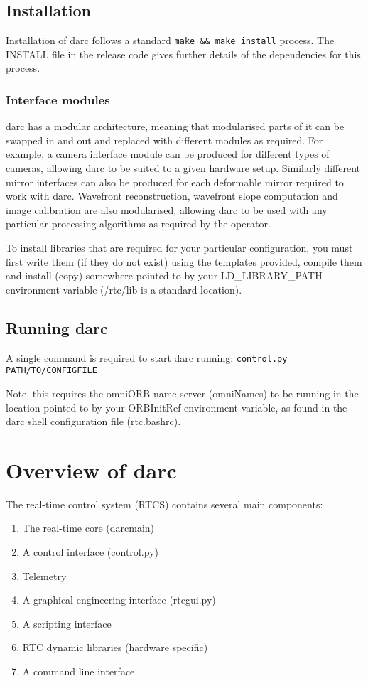 \documentclass[a4,10pt]{article}
\newcommand{\rtcs}{real-time control system (RTCS)\renewcommand{\rtcs}{RTCS\xspace}\xspace}
\begin{document}
\subsection{Installation}
Installation of darc follows a standard {\tt make \&\& make install}
process.  The INSTALL file in the release code gives further details
of the dependencies for this process.

\subsubsection{Interface modules}
darc has a modular architecture, meaning that modularised parts of it
can be swapped in and out and replaced with different modules as
required.  For example, a camera interface module can be produced for
different types of cameras, allowing darc to be suited to a given
hardware setup.  Similarly different mirror interfaces can also be
produced for each deformable mirror required to work with darc.
Wavefront reconstruction, wavefront slope computation and image
calibration are also modularised, allowing darc to be used with any
particular processing algorithms as required by the operator.

To install libraries that are required for your particular
configuration, you must first write them (if they do not exist) using
the templates provided, compile them and install (copy) somewhere pointed to
by your LD\_LIBRARY\_PATH environment variable (/rtc/lib is a standard
location).

\subsection{Running darc}
A single command is required to start darc running: 
{\tt control.py PATH/TO/CONFIGFILE}

Note, this requires the omniORB name server (omniNames) to be running in the
location pointed to by your ORBInitRef environment variable, as found
in the darc shell configuration file (rtc.bashrc).

\section{Overview of darc}
The \rtcs contains several main components:
\begin{enumerate}
\item The real-time core (darcmain)
\item A control interface (control.py)
\item Telemetry
\item A graphical engineering interface (rtcgui.py)
\item A scripting interface
\item RTC dynamic libraries (hardware specific)
\item A command line interface
\end{enumerate}
\end{document}
